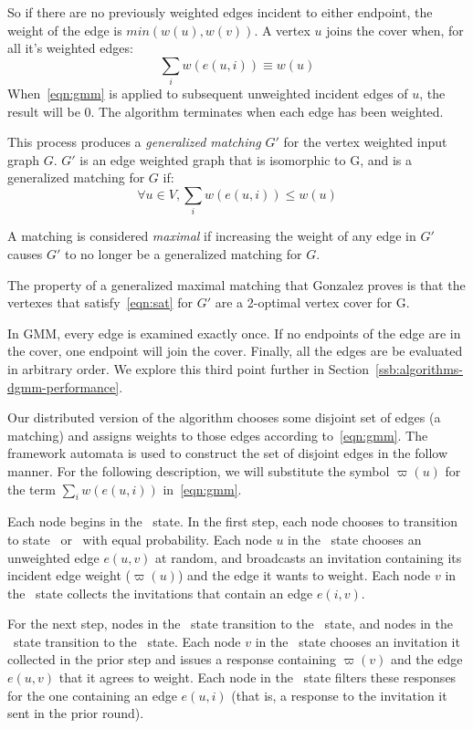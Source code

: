 \documentclass[conference, 10pt, letter]{IEEEtran}
\begin{document}


So if there are no previously weighted edges incident to either endpoint, the weight of the edge is $min(w(u),w(v))$. A vertex $u$ joins the cover when, for all it's weighted edges: \begin{equation}\sum_i w(e(u,i)) \equiv w(u) \label{eqn:sat} \end{equation} When~\eqref{eqn:gmm} is applied to subsequent unweighted incident edges of $u$, the result will be 0. The algorithm terminates when each edge has been weighted. 

This process produces a {\em generalized matching} $G'$ for the vertex weighted input graph $G$. $G'$ is an edge weighted graph that is isomorphic to G, and is a generalized matching for $G$ if: 
\begin{equation}
\forall u \in V, \sum_i w(e(u,i)) \le w(u)\end{equation}

A matching is considered {\em maximal} if increasing the weight of any edge in $G'$ causes $G'$ to no longer be a generalized matching for $G$.

The property of a generalized maximal matching that Gonzalez proves is that the vertexes that satisfy~\eqref{eqn:sat} for $G'$ are a 2-optimal vertex cover for G.

In GMM, every edge is examined exactly once. If no endpoints of the edge are in the cover, one endpoint will join the cover. Finally, all the edges are be evaluated in arbitrary order. We explore this third point further in Section~\ref{ssb:algorithms-dgmm-performance}. 

Our distributed version of the algorithm chooses some disjoint set of edges (a matching) and assigns weights to those edges according to~\eqref{eqn:gmm}. The framework automata is used to construct the set of disjoint edges in the follow manner. For the following description, we will substitute the symbol $\varpi(u)$ for the term $\sum_i w(e(u,i))$ in~\eqref{eqn:gmm}.

Each node begins in the \cCd\ state. In the first step, each node chooses to transition to state \cId\ or \cLd\ with equal probability. Each node $u$ in the \cId\ state chooses an unweighted edge $e(u,v)$ at random, and broadcasts an invitation containing its incident edge weight ($\varpi(u)$) and the edge it wants to weight. Each node $v$ in the \cLd\ state collects the invitations that contain an edge $e(i,v)$.

For the next step, nodes in the \cLd\ state transition to the \cRd\ state, and nodes in the \cId\ state transition to the \cWd\ state. Each node $v$ in the \cLd\ state chooses an invitation it collected in the prior step and issues a response containing $\varpi(v)$ and the edge $e(u,v)$ that it agrees to weight. Each node in the \cWd\ state filters these responses for the one containing an edge $e(u,i)$ (that is, a response to the invitation it sent in the prior round). 
\end{document}
